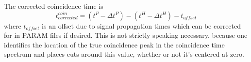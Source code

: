 The corrected coincidence time is
\begin{equation}
    t^{coin}_{corrected} = (t^P - \Delta t^P) - (t^H - \Delta t^H) - t_{offset}
\end{equation}
where $t_{offset}$ is an offset due to signal propagation times which can be
corrected for in PARAM files if desired.
This is not strictly speaking necessary, because one identifies the location of
the true coincidence peak in the coincidence time spectrum and places cuts
around this value, whether or not it's centered at zero.

